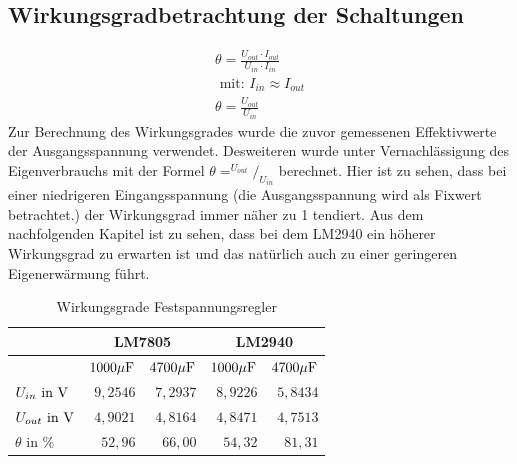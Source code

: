 \subsection{Wirkungsgradbetrachtung der Schaltungen}
\begin{align}
    \theta = \frac{U_{out}\cdot I_{out}}{U_{in}\cdot I_{in}} \\
    \text{ mit: } I_{in} \approx I_{out} \\
    \theta = \frac{U_{out}}{U_{in}}
\end{align}
Zur Berechnung des Wirkungsgrades wurde die zuvor gemessenen Effektivwerte der Ausgangsspannung verwendet. Desweiteren wurde unter Vernachlässigung des Eigenverbrauchs mit der Formel $\theta=^{U_{out}}/_{U_{in}}$ berechnet.
Hier ist zu sehen, dass bei einer niedrigeren Eingangsspannung (die Ausgangsspannung wird als Fixwert betrachtet.) der Wirkungsgrad immer näher zu 1 tendiert. Aus dem nachfolgenden Kapitel ist zu sehen, dass bei dem LM2940 ein höherer Wirkungsgrad zu erwarten ist und das natürlich auch zu einer geringeren Eigenerwärmung führt. 
\begin{table}[H]
\centering
\caption{Wirkungsgrade Festspannungsregler}
\label{tab:erg_table_fest_u_reg}
\begin{tabular}{l|r|r|r|r|}
\cline{2-5}
                                                               & \multicolumn{2}{c|}{\cellcolor[HTML]{C0C0C0}LM7805} & \multicolumn{2}{c|}{\cellcolor[HTML]{C0C0C0}LM2940} \\ \hline
\rowcolor[HTML]{C0C0C0} 
\multicolumn{1}{|l|}{\cellcolor[HTML]{C0C0C0}$C$} & $1000\mu\text{F}$                & $4700\mu\text{F}$                & $1000\mu\text{F}$                & $4700\mu\text{F}$                \\ \hline
\multicolumn{1}{|l|}{$U_{in}\text{ in }\text{V}$}                    & $9,2546$                 & $7,2937$                 & $8,9226$                 & $5,8434$                 \\ \hline
\multicolumn{1}{|l|}{$U_{out}\text{ in }\text{V}$}                   & $4,9021$                 & $4,8164$                 & $4,8471$                 & $4,7513$                 \\ \hline
\multicolumn{1}{|l|}{$\theta \text{ in }\%$}                   & $52,96$                  & $66,00$                  & $54,32$                  & $81,31$                  \\ \hline
\end{tabular}
\end{table}